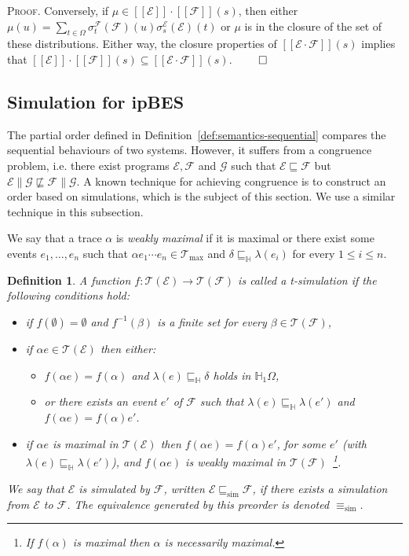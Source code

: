 \documentclass[review]{elsart}
\newtheorem{definition}{Definition}[section]
\newenvironment{proof}{\par
\noindent
\textsc{Proof. }
\noindent}{\hfill\(\qed\)}
\renewcommand{\H}{\mathbb{H}}
\newcommand{\EE}{\mathcal{E}}
\newcommand{\FF}{\mathcal{F}}
\newcommand{\GG}{\mathcal{G}}
\newcommand{\TT}{\mathcal{T}}
\newcommand{\unity}{\delta}
\newcommand{\sem}[1]{[\![#1]\!]}
\newcommand{\refby}{\sqsubseteq}
\newcommand{\refbyh}{\sqsubseteq_{\mathbb{H}}}
\newcommand{\simref}{\refby_{\mathrm{sim}}}
\begin{document}
\begin{proof}
Conversely, if $\mu{\in} \sem{\EE}{\cdot}\sem{\FF}(s)$, then either $\mu(u) = \sum_{t{\in} \Omega}\sigma^{\FF}_t(\FF)(u)\sigma^{\EE}_s(\EE)(t)$ or $\mu$ is in the closure of the set of these distributions. Either way, the closure properties of $\sem{\EE{\cdot}\FF}(s)$ implies that $\sem{\EE}{\cdot}\sem{\FF}(s){\subseteq}\sem{\EE{\cdot}\FF}(s)$. 
\end{proof}


\subsection{Simulation for ipBES}\label{s1511}

The partial order defined in Definition~\ref{def:semantics-sequential} compares the sequential behaviours of two systems. However, it suffers from a congruence problem, i.e. there exist programs $\EE,\FF$ and $\GG$ such that $\EE{\refby}\FF$ but $\EE\|\GG {\not\refby}\FF\|\GG$. A known technique for achieving congruence is to construct an order based on simulations, which is the subject of this section. We use a similar technique in this subsection.

We say that a trace $\alpha$ is \emph{weakly maximal} if it is maximal or there exist some events $e_1,\dots,e_n$ such that $\alpha e_1\cdots e_n{\in}\TT_{\max}$ and $\unity{\refbyh}\lambda(e_i)$ for every $1\leq i\leq n$. 

\begin{definition}\label{def:t-simulation}
A function $f{:}\TT(\EE){\to}\TT(\FF)$ is called a \emph{t-simulation} if the following conditions hold:
\begin{itemize}
\item[-] if $f(\emptyset) = \emptyset$ and $f^{-1}(\beta)$ is a finite set for every $\beta{\in}\TT(\FF)$,
\item[-] if $\alpha e{\in}\TT(\EE)$ then either:
\begin{itemize}
\item $f(\alpha e) = f(\alpha)$ and $\lambda(e)\refbyh\delta$ holds in $\H_1\Omega$,
\item or there exists an event $e'$ of $\FF$ such that $\lambda(e){\refbyh}\lambda(e')$ and $f(\alpha e) {=} f(\alpha) e'$.
\end{itemize} 
\item[-] if $\alpha e$ is maximal in $\TT(\EE)$ then $f(\alpha e) = f(\alpha) e'$, for some $e'$ (with $\lambda(e)\refbyh\lambda(e')$), and $f(\alpha e)$ is weakly maximal in $\TT(\FF)$~\footnote{If $f(\alpha)$ is maximal then $\alpha$ is necessarily maximal.}.
\end{itemize}
We say that $\EE$ is simulated by $\FF$, written $\EE\simref\FF$, if there exists a simulation from $\EE$ to $\FF$. The equivalence generated by this preorder is denoted $\equiv_{\textrm{sim}}$.
\end{definition}
\end{document}
